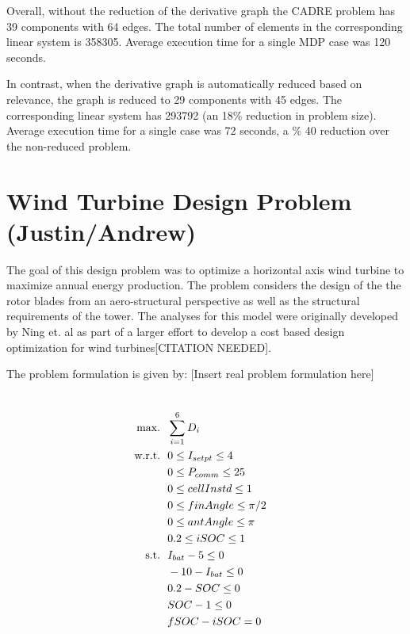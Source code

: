 \documentclass[]{aiaa-tc} %
\newcommand{\txt}{\textrm}
\begin{document}
            Overall, without the reduction of the derivative graph the CADRE problem
            has 39 components with 64 edges. The total number of elements in
            the corresponding linear system is 358305. Average execution time
            for a single MDP case was 120 seconds.

            In contrast, when the derivative graph is automatically reduced based on
            relevance, the graph is reduced to 29 components with 45 edges.
            The corresponding linear system has 293792 (an 18\% reduction in
            problem size). Average execution time for a single case was
            72 seconds, a \% 40 reduction over the
            non-reduced problem.


  \section{Wind Turbine Design Problem (Justin/Andrew)}

    The goal of this design problem was to optimize a horizontal axis wind turbine
    to maximize annual energy production. The problem considers the design of
    the the rotor blades from an aero-structural perspective as well as the structural requirements of the tower. The analyses for this model were originally developed
    by Ning et. al as part of a larger effort to develop a cost based design optimization
    for wind turbines[CITATION NEEDED].

    The problem formulation is given by: [Insert real problem formulation here]

    \begin{align}
        \\\txt{max.} &\ \ \sum_{i=1}^6 D_i \notag
        \\\txt{w.r.t.} & \ \ 0 \le I_{setpt} \le 4 \notag
        \\     & \ \ 0 \le P_{comm} \le 25 \notag
        \\     & \ \ 0 \le cellInstd \le 1 \notag
        \\     & \ \ 0 \le finAngle \le \pi/2 \notag
        \\     & \ \ 0 \le antAngle \le \pi \notag
        \\     & \ \ 0.2 \le iSOC \le 1 \notag
        \\\txt{s.t.} & \ \ I_{bat} - 5 \le 0 \notag
        \\     & \ \ -10 - I_{bat} \le 0 \notag
        \\     & \ \ 0.2 - SOC \le 0 \notag
        \\     & \ \ SOC - 1 \le 0 \notag
        \\     & \ \ fSOC - iSOC = 0 \notag
        \label{eqn:wt_formulation}
    \end{align}
\end{document}
